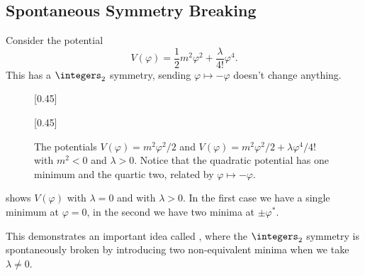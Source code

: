 \documentclass[fleqn]{NotesClass}
\newcommand{\cyclicGroupZ}[1][n]{\integers_{#1}}
\begin{document}
    \subsection{Spontaneous Symmetry Breaking}
    Consider the potential
    \begin{equation}
        V(\varphi) = \frac{1}{2}m^2 \varphi^2 + \frac{\lambda}{4!}\varphi^4.
    \end{equation}
    This has a \(\cyclicGroupZ[2]\) symmetry, sending \(\varphi \mapsto -\varphi\) doesn't change anything.
    
    \begin{figure}
        [0.45\textwidth]{
        }
        [0.45\textwidth]{
        }
        \caption[Potentials and their symmetries]{The potentials \(V(\varphi) = m^2\varphi^2/2\) and \(V(\varphi) = m^2\varphi^2/2 + \lambda \varphi^4/4!\) with \(m^2 < 0\) and \(\lambda > 0\). Notice that the quadratic potential has one minimum and the quartic two, related by \(\varphi \mapsto -\varphi\).}
        \label{fig:potentials}
    \end{figure}
    
     shows \(V(\varphi)\) with \(\lambda = 0\) and with \(\lambda > 0\).
    In the first case we have a single minimum at \(\varphi = 0\), in the second we have two minima at \(\pm\varphi^*\).
    
    This demonstrates an important idea called , where the \(\cyclicGroupZ[2]\) symmetry is spontaneously broken by introducing two non-equivalent minima when we take \(\lambda \ne 0\).
    
\end{document}
